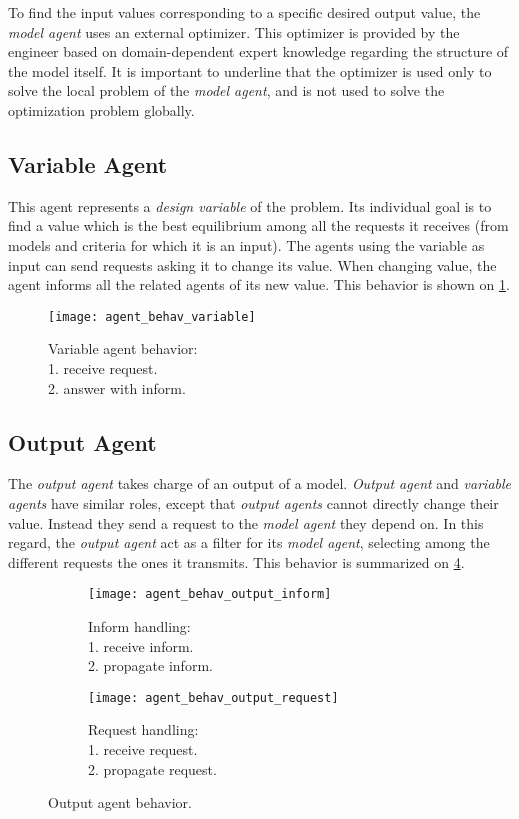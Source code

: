 To find the input values corresponding to a specific desired output value, the \emph{model agent} uses an external optimizer. This optimizer is provided by the engineer based on domain-dependent expert knowledge regarding the structure of the model itself.
It is important to underline that the optimizer is used only to solve the local problem of the \emph{model agent}, and is not used to solve the optimization problem globally.

\subsection{Variable Agent}

This agent represents a \emph{design variable} of the problem. Its individual goal is to find a value which is the best equilibrium among all the requests it receives (from models and criteria for which it is an input). The agents using the variable as input can send requests asking it to change its value. When changing value, the agent informs all the related agents of its new value. This behavior is shown on \figurename{} \ref{agent_behav_variable}. 

\begin{figure}
\centering
\texttt{[image: agent\_behav\_variable]}
\caption{Variable agent behavior:\\1. receive request.\\2. answer with inform.}\label{agent_behav_variable}
\end{figure}

\subsection{Output Agent}
The \emph{output agent} takes charge of an output of a model. \emph{Output agent} and \emph{variable agents} have similar roles, except that \emph{output agents} cannot directly change their value. Instead they send a request to the \emph{model agent} they depend on. In this regard, the \emph{output agent} act as a filter for its \emph{model agent}, selecting among the different requests the ones it transmits. This behavior is summarized on \figurename{} \ref{agent_behav_output}.

\begin{figure}
\centering
\begin{subfigure}{0.25\textwidth}
		\centering
		\texttt{[image: agent\_behav\_output\_inform]}
		\caption{Inform handling:\\1. receive inform.\\2. propagate inform.}\label{agent_behav_output:inf}
\end{subfigure}
\qquad
\begin{subfigure}{0.25\textwidth}
		\centering
		\texttt{[image: agent\_behav\_output\_request]}
		\caption{Request handling:\\1. receive request.\\2. propagate request.}\label{agent_behav_output:req}
\end{subfigure}
\caption{Output agent behavior.}\label{agent_behav_output}
\end{figure}

